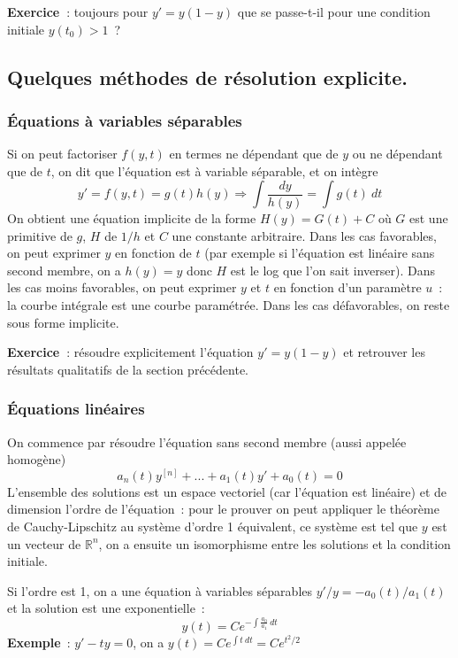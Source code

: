 \documentclass[a4paper,11pt]{article}
\newcommand{\R}{{\mathbb{R}}}
\begin{document}
{\bf Exercice~}: toujours pour $y'=y(1-y)$ que se passe-t-il pour une
condition initiale $y(t_0)>1$~?

\subsection{Quelques m\'ethodes de r\'esolution explicite.}

\subsubsection{\'Equations \`a variables
  s\'eparables}
Si on peut factoriser $f(y,t)$ en termes ne d\'ependant que
de $y$ ou ne d\'ependant que de $t$, on dit que l'\'equation
est \`a variable s\'eparable, et on int\`egre
$$ y'=f(y,t)=g(t)h(y) \Rightarrow \int \frac{dy}{h(y)} = \int g(t) \
dt$$
On obtient une \'equation implicite de la forme $H(y)=G(t)+C$ o\`u
$G$ est une primitive de $g$, $H$ de $1/h$ et $C$ une constante
arbitraire. Dans les cas favorables, on peut exprimer $y$ en fonction
de $t$ (par exemple si l'\'equation est lin\'eaire sans second membre,
on a $h(y)=y$ donc $H$ est le log que l'on sait
inverser). Dans les cas moins favorables, on peut exprimer $y$ et
$t$ en fonction d'un param\`etre $u$~: la courbe int\'egrale est
une courbe param\'etr\'ee. Dans les cas d\'efavorables, on reste
sous forme implicite.

{\bf Exercice~}: r\'esoudre explicitement l'\'equation $y'=y(1-y)$
et retrouver les r\'esultats qualitatifs de la section pr\'ec\'edente.

\subsubsection{\'Equations lin\'eaires}
On commence par r\'esoudre l'\'equation sans second membre
(aussi appel\'ee homog\`ene)
$$ a_n(t) y^{[n]} +...+a_1(t)y'+a_0(t)=0$$
 L'ensemble
des solutions est un espace vectoriel (car l'\'equation
est lin\'eaire) et de dimension l'ordre de
l'\'equation~: pour le prouver on peut appliquer le th\'eor\`eme
de Cauchy-Lipschitz au syst\`eme d'ordre 1 \'equivalent, ce
syst\`eme est tel que $y$ est un vecteur de $\R^n$, on a ensuite
un isomorphisme entre les solutions et la condition initiale.

Si l'ordre est 1, on a une \'equation \`a variables s\'eparables
$ y'/y=-a_0(t)/a_1(t)$ et la solution est une exponentielle~:
$$ y(t)=Ce^{-\int \frac{a_0}{a_1} \ dt}$$
{\bf Exemple}~: $y'-ty=0$, on a $y(t)=Ce^{\int t \ dt}=Ce^{t^2/2}$
\end{document}
